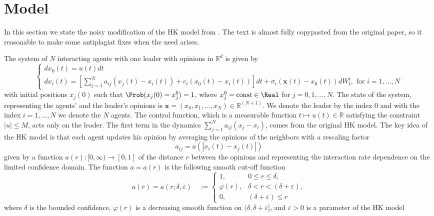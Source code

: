 \section{Model}

In this section we state the noisy modification of the HK model from \cite{leader_hk}. 
The text is almost fully copypasted from the original paper, so it reasonable to make some 
antiplagiat fixes when the need arises.

The system of $N$ interacting agents with one leader with opinions in $\mathbb{R}^d$ is given by
\begin{equation}\label{eq:model_init} 
\left\{\begin{array}{l}
dx_0(t)=u(t)dt \\
dx_i(t)=\left[\sum_{j=1}^N a_{i j}\left(x_j(t)-x_i(t)\right)+c_i\left(x_0(t)-x_i(t)\right)\right] dt + \sigma_i(\mathbf{x}(t) - x_0(t)) dW^i_t,  \text { for } i=1, \ldots, N
\end{array}\right.
\end{equation}
with initial positions $x_j(0)$ such that $\Prob(x_j(0) = x_j^0) = 1$, where $x_j^0 = \operatorname*{const} \in \Real$ for $j=0,1, \ldots, N$. The state of the system, 
representing the agents' and the leader's opinions is 
$\mathbf{x}=\left(x_0, x_1, \ldots, x_N\right) \in \mathbb{R}^{(N+1)}$. We denote the leader by the index 0 and with the index $i=1, \ldots, N$ we denote the $N$ agents. 
The control function, which is a measurable function $t \mapsto u(t) \in \mathbb{R}$ satisfying the constraint $|u| \leq M$, acts only on the leader.
The first term in the dynamics $\sum_{j=1}^N a_{i j}\left(x_j-x_i\right)$, comes from the original HK model. The key idea of the $\mathrm{HK}$ model 
is that each agent updates his opinion by averaging the opinions of the neighbors with a rescaling factor
$$
a_{i j}=a\left(|x_i(t)-x_j(t)|\right)
$$
given by a function $a(r):[0, \infty) \rightarrow[0,1]$ of the distance $r$ between the opinions and representing the interaction rate dependence on the limited confidence domain. 
The function $a=a(r)$ is the following smooth cut-off function
$$
a(r)=a(r ; \delta, \varepsilon) \quad:= \begin{cases}1, & 0 \leq r \leq \delta, \\ \varphi(r), & \delta<r<(\delta+\varepsilon), \\ 0, & (\delta+\varepsilon) \leq r\end{cases}
$$
where $\delta$ is the bounded confidence, $\varphi(r)$ is a decreasing smooth function on $(\delta, \delta+\varepsilon]$, and $\varepsilon>0$ is a parameter of the HK model 
